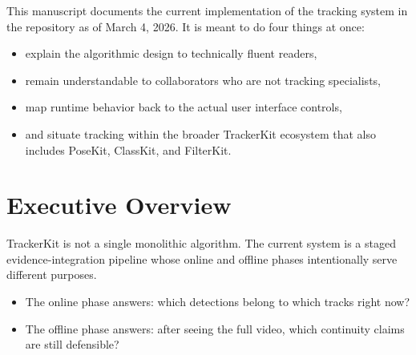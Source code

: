 \documentclass[11pt]{article}
\newcommand{\codepath}[1]{\path{#1}}
\begin{document}
\begin{titlepage}
\vspace{1.1cm}

\begin{minipage}{0.92\linewidth}
\color{Ink}
\large
This manuscript documents the current implementation of the tracking system in the repository as of March 4, 2026. It is meant to do four things at once:

\begin{itemize}
  \item explain the algorithmic design to technically fluent readers,
  \item remain understandable to collaborators who are not tracking specialists,
  \item map runtime behavior back to the actual user interface controls,
  \item and situate tracking within the broader TrackerKit ecosystem that also includes PoseKit, ClassKit, and FilterKit.
\end{itemize}
\end{minipage}

\vfill


\end{titlepage}

\clearpage
{}
\tableofcontents
\clearpage

\section{Executive Overview}

TrackerKit is not a single monolithic algorithm. The current system is a staged evidence-integration pipeline whose online and offline phases intentionally serve different purposes.

\begin{itemize}
  \item The online phase answers: which detections belong to which tracks right now?
  \item The offline phase answers: after seeing the full video, which continuity claims are still defensible?
\end{itemize}
\end{document}
